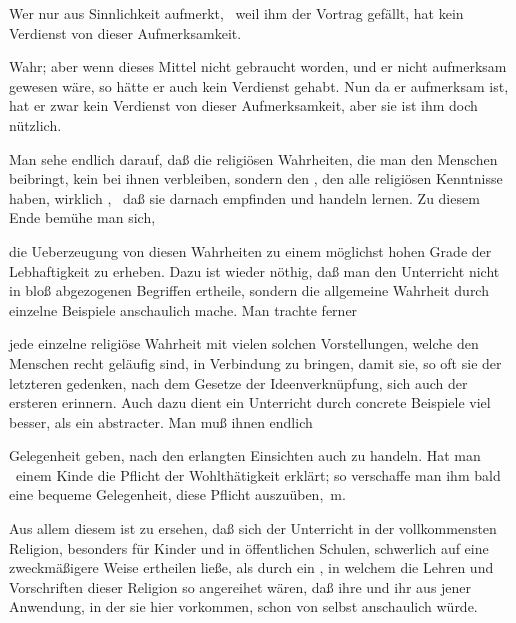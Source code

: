  Wer nur aus Sinnlichkeit aufmerkt, \zB\ weil ihm der Vortrag gefällt, hat kein Verdienst von dieser Aufmerksamkeit.\par
{} Wahr; aber wenn dieses Mittel nicht gebraucht worden, und er nicht aufmerksam gewesen wäre, so hätte er auch kein Verdienst gehabt. Nun da er aufmerksam ist, hat er zwar kein Verdienst von dieser Aufmerksamkeit, aber sie ist ihm doch nützlich.
\begin{aufza}\setcounter{enumi}{4}
\item Man sehe endlich darauf, daß die religiösen Wahrheiten, die man den Menschen beibringt, kein  bei ihnen verbleiben, sondern den , den alle religiösen Kenntnisse haben, wirklich , \dh\ daß sie darnach empfinden und handeln lernen. Zu diesem Ende bemühe man sich,
\begin{aufzb}
\item die Ueberzeugung von diesen Wahrheiten zu einem möglichst hohen Grade der Lebhaftigkeit zu erheben. Dazu ist wieder nöthig, daß man den Unterricht nicht in bloß abgezogenen Begriffen ertheile, sondern die allgemeine Wahrheit durch einzelne Beispiele anschaulich mache. Man trachte ferner
\item jede einzelne religiöse Wahrheit mit vielen solchen Vorstellungen, welche den Menschen recht geläufig sind, in Verbindung zu bringen, damit sie, so oft sie der letzteren gedenken, nach dem Gesetze der Ideenverknüpfung, sich auch der ersteren erinnern. Auch dazu dient ein Unterricht durch concrete Beispiele viel besser, als ein abstracter. Man muß ihnen endlich~
\item Gelegenheit geben, nach den erlangten Einsichten auch zu handeln. Hat man \zB\ einem Kinde die Pflicht der Wohlthätigkeit erklärt; so verschaffe man ihm bald eine bequeme Gelegenheit, diese Pflicht auszuüben, \udgl\,m.
\end{aufzb}
\item Aus allem diesem ist zu ersehen, daß sich der Unterricht in der vollkommensten Religion, besonders für Kinder und in öffentlichen Schulen, schwerlich auf eine zweckmäßigere Weise ertheilen ließe, als durch ein , in welchem die Lehren und Vorschriften dieser Religion  so angereihet wären, daß ihre  und ihr  aus jener Anwendung, in der sie hier vorkommen, schon von selbst anschaulich würde.
\begin{RWanm}

\end{RWanm}
\end{aufza}

